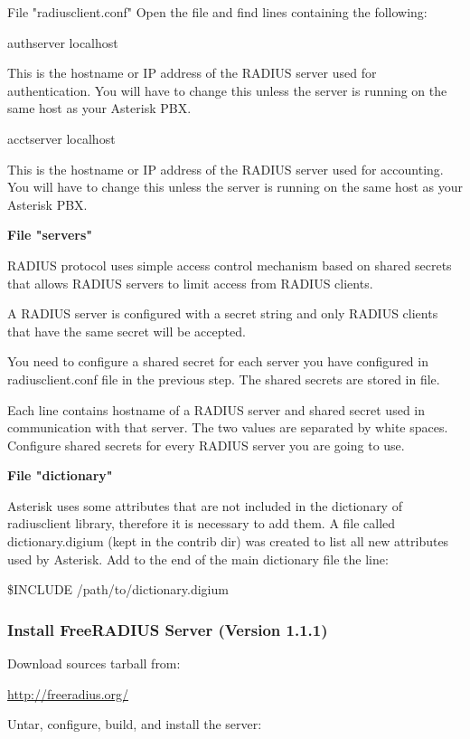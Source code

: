 	File "radiusclient.conf"
		Open the file and find lines containing the following:

			authserver      localhost
	
	This is the hostname or IP address of the RADIUS server used for
	authentication. You will have to change this unless the server is
	running on the same host as your Asterisk PBX.

			acctserver      localhost

	This is the hostname or IP address of the RADIUS server used for
	accounting. You will have to change this unless the server is running
	on the same host as your Asterisk PBX.

	\textbf{File "servers"}
		
	RADIUS protocol uses simple access control mechanism based on shared
	secrets that allows RADIUS servers to limit access from RADIUS clients.
		
	A RADIUS server is configured with a secret string and only RADIUS
	clients that have the same secret will be accepted.

	You need to configure a shared secret for each server you have
	configured in radiusclient.conf file in the previous step. The shared
	secrets are stored in  file.

	Each line contains hostname of a RADIUS server and shared secret
	used in communication with that server. The two values are separated
	by white spaces. Configure shared secrets for every RADIUS server you
	are going to use.

	\textbf{File "dictionary"}
			
	Asterisk uses some attributes that are not included in the
	dictionary of radiusclient library, therefore it is necessary to add
	them. A file called dictionary.digium (kept in the contrib dir)
	was created to list all new attributes used by Asterisk.
	Add to the end of the main dictionary file
	 the line:

		\$INCLUDE /path/to/dictionary.digium

\subsubsection{Install FreeRADIUS Server (Version 1.1.1)}

	Download sources tarball from:

		\url{http://freeradius.org/}
			
	Untar, configure, build, and install the server:

